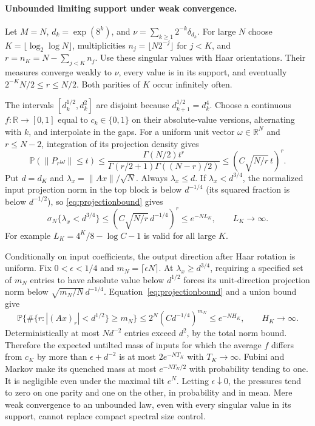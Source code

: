\documentclass[11pt]{article}
\numberwithin{equation}{section}
\theoremstyle{definition}
\newcommand{\Pbb}{\mathbb P}
\newcommand{\R}{\mathbb R}
\newcommand{\norm}[1]{\lVert #1\rVert}
\begin{document}
\paragraph{Unbounded limiting support under weak convergence.}
Let $M=N$, $d_k=\exp(8^k)$, and $\nu=\sum_{k\ge1}2^{-k}\delta_{d_k}$. For large $N$ choose $K=\lfloor\log_2\log N\rfloor$, multiplicities $n_j=\lfloor N2^{-j}\rfloor$ for $j<K$, and $r=n_K=N-\sum_{j<K}n_j$. Use these singular values with Haar orientations. Their measures converge weakly to $\nu$, every value is in its support, and eventually $2^{-K}N/2\le r\le N/2$. Both parities of $K$ occur infinitely often.

The intervals $[d_k^{1/2},d_k^2]$ are disjoint because $d_{k+1}^{1/2}=d_k^4$. Choose a continuous $f:\R\to[0,1]$ equal to $c_k\in\{0,1\}$ on their absolute-value versions, alternating with $k$, and interpolate in the gaps. For a uniform unit vector $\omega\in\R^N$ and $r\le N-2$, integration of its projection density gives
\begin{equation}\label{eq:projectionbound}
\Pbb(\norm{P_r\omega}\le t)
\le\frac{\Gamma(N/2)t^r}{\Gamma(r/2+1)\Gamma((N-r)/2)}
\le(C\sqrt{N/r}\,t)^r.
\end{equation}
Put $d=d_K$ and $\lambda_x=\norm{Ax}/\sqrt N$. Always $\lambda_x\le d$. If $\lambda_x<d^{3/4}$, the normalized input projection norm in the top block is below $d^{-1/4}$ (its squared fraction is below $d^{-1/2}$), so \eqref{eq:projectionbound} gives
\[
\sigma_N\{\lambda_x<d^{3/4}\}
\le(C\sqrt{N/r}\,d^{-1/4})^r\le e^{-NL_K},\qquad L_K\longrightarrow\infty.
\]
For example $L_K=4^K/8-\log C-1$ is valid for all large $K$.

Conditionally on input coefficients, the output direction after Haar rotation is uniform. Fix $0<\epsilon<1/4$ and $m_N=\lceil\epsilon N\rceil$. At $\lambda_x\ge d^{3/4}$, requiring a specified set of $m_N$ entries to have absolute value below $d^{1/2}$ forces its unit-direction projection norm below $\sqrt{m_N/N}\,d^{-1/4}$. Equation~\eqref{eq:projectionbound} and a union bound give
\[
\Pbb\{\#\{r:|(Ax)_r|<d^{1/2}\}\ge m_N\}
\le2^N(Cd^{-1/4})^{m_N}\le e^{-NH_K},\qquad H_K\longrightarrow\infty.
\]
Deterministically at most $Nd^{-2}$ entries exceed $d^2$, by the total norm bound. Therefore the expected untilted mass of inputs for which the average $f$ differs from $c_K$ by more than $\epsilon+d^{-2}$ is at most $2e^{-NT_K}$ with $T_K\to\infty$. Fubini and Markov make its quenched mass at most $e^{-NT_K/2}$ with probability tending to one. It is negligible even under the maximal tilt $e^N$. Letting $\epsilon\downarrow0$, the pressures tend to zero on one parity and one on the other, in probability and in mean. Mere weak convergence to an unbounded law, even with every singular value in its support, cannot replace compact spectral size control.
\end{document}
